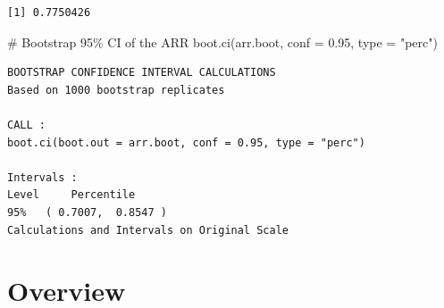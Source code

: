 \documentclass[
  letterpaper,
  DIV=11,
  numbers=noendperiod]{scrreprt}
\newenvironment{Shaded}{\begin{snugshade}}{\end{snugshade}}
\newcommand{\AttributeTok}[1]{\textcolor[rgb]{0.40,0.45,0.13}{#1}}
\newcommand{\CommentTok}[1]{\textcolor[rgb]{0.37,0.37,0.37}{#1}}
\newcommand{\FloatTok}[1]{\textcolor[rgb]{0.68,0.00,0.00}{#1}}
\newcommand{\FunctionTok}[1]{\textcolor[rgb]{0.28,0.35,0.67}{#1}}
\newcommand{\NormalTok}[1]{\textcolor[rgb]{0.00,0.23,0.31}{#1}}
\newcommand{\StringTok}[1]{\textcolor[rgb]{0.13,0.47,0.30}{#1}}
\begin{document}
\begin{verbatim}
[1] 0.7750426
\end{verbatim}

\begin{Shaded}
\begin{Highlighting}[]
\CommentTok{\# Bootstrap 95\% CI of the ARR}
\FunctionTok{boot.ci}\NormalTok{(arr.boot, }\AttributeTok{conf =} \FloatTok{0.95}\NormalTok{, }\AttributeTok{type =} \StringTok{"perc"}\NormalTok{)}
\end{Highlighting}
\end{Shaded}

\begin{verbatim}
BOOTSTRAP CONFIDENCE INTERVAL CALCULATIONS
Based on 1000 bootstrap replicates

CALL : 
boot.ci(boot.out = arr.boot, conf = 0.95, type = "perc")

Intervals : 
Level     Percentile     
95%   ( 0.7007,  0.8547 )  
Calculations and Intervals on Original Scale
\end{verbatim}

\hypertarget{overview}{%
\section{Overview}\label{overview}}
\end{document}
